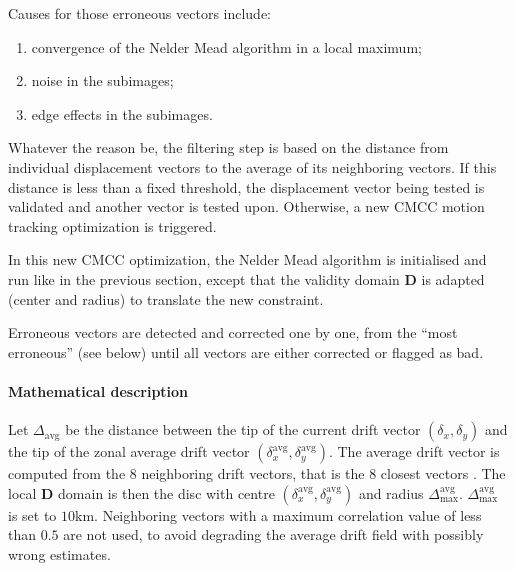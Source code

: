 \documentclass[letterpaper,10pt,english]{jupyterBook}
\begin{document}
\sphinxAtStartPar
Causes for those erroneous vectors include:
\begin{enumerate}
%
\item {} 
\sphinxAtStartPar
convergence of the Nelder Mead algorithm in a local maximum;

\item {} 
\sphinxAtStartPar
noise in the sub\sphinxhyphen{}images;

\item {} 
\sphinxAtStartPar
edge effects in the sub\sphinxhyphen{}images.

\end{enumerate}

\sphinxAtStartPar
Whatever the reason be, the filtering step is based on the
distance from individual displacement vectors to the average of its
neighboring vectors. If this distance is less than a fixed threshold,
the displacement vector being tested is validated and another vector is
tested upon. Otherwise, a new CMCC motion tracking optimization is triggered.

\sphinxAtStartPar
In this new CMCC optimization, the Nelder Mead algorithm is initialised and run like in the previous
section, except that the validity domain \(\mathbf{D}\) is adapted (center and radius) to translate the new constraint.

\sphinxAtStartPar
Erroneous vectors are detected and corrected one by one, from the “most erroneous” (see below) until
all vectors are either corrected or flagged as bad.


\paragraph{Mathematical description}
\label{\detokenize{baseline_algorithm_definition:id18}}
\sphinxAtStartPar
Let \(\Delta_{\textrm{avg}}\) be the distance between the tip of the
current drift vector \((\delta_x,\delta_y)\) and the tip of the zonal
average drift vector
\((\delta^{\textrm{avg}}_x,\delta^{\textrm{avg}}_y)\). The average drift
vector is computed from the 8 neighboring drift vectors, that is the 8
closest vectors . The local \(\mathbf{D}\)
domain is then the disc with centre
\((\delta^{\textrm{avg}}_x,\delta^{\textrm{avg}}_y)\) and radius
\(\Delta^{\textrm{avg}}_{\textrm{max}}\). \(\Delta^{\textrm{avg}}_{\textrm{max}}\) is set to \(10\)km.
Neighboring vectors with a maximum correlation value of less than \(0.5\) are not
used, to avoid degrading the average drift field with possibly wrong
estimates.
\end{document}
